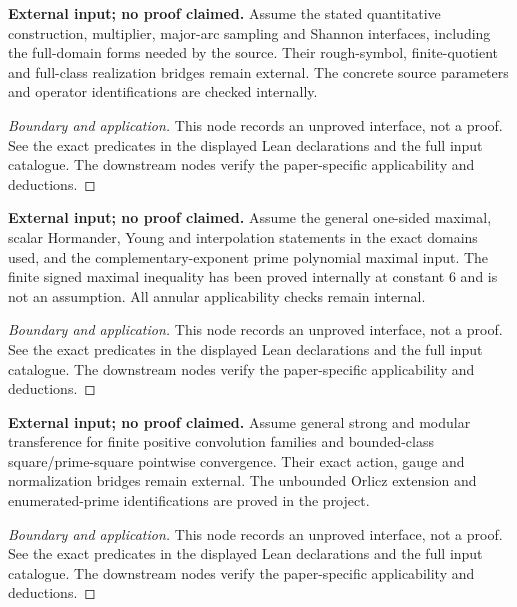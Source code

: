 \begin{lemma}
\label{input_iw_sampling}
\uses{}
\textbf{External input; no proof claimed.} Assume the stated quantitative construction, multiplier, major-arc sampling and Shannon interfaces, including the full-domain forms needed by the source. Their rough-symbol, finite-quotient and full-class realization bridges remain external. The concrete source parameters and operator identifications are checked internally.
\end{lemma}
\begin{proof}[Boundary and application]
\uses{}
This node records an unproved interface, not a proof. See the exact predicates in the displayed Lean declarations and the full input catalogue. The downstream nodes verify the paper-specific applicability and deductions.
\end{proof}

\begin{lemma}
\label{input_real_variable}
\uses{}
\textbf{External input; no proof claimed.} Assume the general one-sided maximal, scalar Hormander, Young and interpolation statements in the exact domains used, and the complementary-exponent prime polynomial maximal input. The finite signed maximal inequality has been proved internally at constant $6$ and is not an assumption. All annular applicability checks remain internal.
\end{lemma}
\begin{proof}[Boundary and application]
\uses{}
This node records an unproved interface, not a proof. See the exact predicates in the displayed Lean declarations and the full input catalogue. The downstream nodes verify the paper-specific applicability and deductions.
\end{proof}

\begin{lemma}
\label{input_ergodic}
\uses{}
\textbf{External input; no proof claimed.} Assume general strong and modular transference for finite positive convolution families and bounded-class square/prime-square pointwise convergence. Their exact action, gauge and normalization bridges remain external. The unbounded Orlicz extension and enumerated-prime identifications are proved in the project.
\end{lemma}
\begin{proof}[Boundary and application]
\uses{}
This node records an unproved interface, not a proof. See the exact predicates in the displayed Lean declarations and the full input catalogue. The downstream nodes verify the paper-specific applicability and deductions.
\end{proof}

